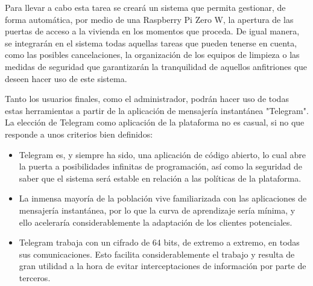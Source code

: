 \begin{resumen}
Para llevar a cabo esta tarea se creará un sistema que permita gestionar, de forma automática, por medio de una Raspberry Pi Zero W, la apertura de las puertas de acceso a la vivienda en los momentos que proceda. De igual manera, se integrarán en el sistema todas aquellas tareas que pueden tenerse en cuenta, como las posibles cancelaciones, la organización de los equipos de limpieza o las medidas de seguridad que garantizarán la tranquilidad de aquellos anfitriones que deseen hacer uso de este sistema.

Tanto los usuarios finales, como el administrador, podrán hacer uso de todas estas herramientas a partir de la aplicación de mensajería instantánea "Telegram". La elección de Telegram como aplicación de la plataforma no es casual, si no que responde a unos criterios bien definidos:
\begin{itemize}
\item Telegram es, y siempre ha sido, una aplicación de código abierto, lo cual abre la puerta a posibilidades infinitas de programación, así como la seguridad de saber que el sistema será estable en relación a las políticas de la plataforma. 
\item La inmensa mayoría de la población vive familiarizada con las aplicaciones de mensajería instantánea, por lo que la curva de aprendizaje sería mínima, y ello aceleraría considerablemente la adaptación de los clientes potenciales.
\item Telegram trabaja con un cifrado de 64 bits, de extremo a extremo, en todas sus comunicaciones. Esto facilita considerablemente el trabajo y resulta de gran utilidad a la hora de evitar interceptaciones de información por parte de terceros.
\end{itemize}
\end{resumen}




